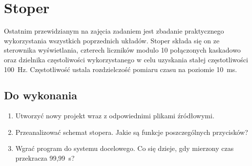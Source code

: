\documentclass[12pt]{article}
\begin{document}
\section{Stoper}
Ostatnim przewidzianym na zajęcia zadaniem jest zbadanie praktycznego wykorzystania wszystkich poprzednich układów. Stoper składa się on ze sterownika wyświetlania, czterech liczników modulo 10 połączonych kaskadowo oraz dzielnika częstoliwości wykorzystanego w celu uzyskania stałej częstotliwości 100~Hz. Częstotliwość ustala rozdzielczość pomiaru czasu na poziomie 10~ms. 
\subsection{Do wykonania}
\begin{enumerate}[wide, labelwidth=!, labelindent=0pt]	
\item Utworzyć nowy projekt wraz z odpowiednimi plikami źródłowymi.
\item Przeanalizować schemat stopera. Jakie są funkcje poszczególnych przycisków?
\item Wgrać program do systemu docelowego. Co się dzieje, gdy mierzony czas przekracza 99,99~s?
\end{enumerate}
\end{document}
